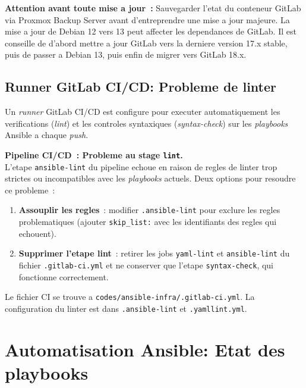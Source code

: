 \documentclass[a4paper,11pt]{article}
\newenvironment{warnbox}{%
  \begin{mdframed}[linecolor=orange,backgroundcolor=orange!8,linewidth=1pt,
    leftmargin=0pt,rightmargin=0pt,innertopmargin=6pt,innerbottommargin=6pt]
}{%
  \end{mdframed}
}
\begin{document}
\begin{warnbox}
  \textbf{Attention avant toute mise a jour~:} Sauvegarder l'etat du conteneur GitLab
  via Proxmox Backup Server avant d'entreprendre une mise a jour majeure.
  La mise a jour de Debian 12 vers 13 peut affecter les dependances de GitLab.
  Il est conseille de d'abord mettre a jour GitLab vers la derniere version 17.x stable,
  puis de passer a Debian 13, puis enfin de migrer vers GitLab 18.x.
\end{warnbox}

\subsection{Runner GitLab CI/CD: Probleme de linter}

Un \textit{runner} GitLab CI/CD est configure pour executer automatiquement
les verifications (\textit{lint}) et les controles syntaxiques (\textit{syntax-check})
sur les \textit{playbooks} Ansible a chaque \textit{push}.

\begin{warnbox}
  \textbf{Pipeline CI/CD~: Probleme au stage \texttt{lint}.}\\
  L'etape \texttt{ansible-lint} du pipeline echoue en raison de regles de linter
  trop strictes ou incompatibles avec les \textit{playbooks} actuels. Deux options
  pour resoudre ce probleme~:
  \begin{enumerate}[noitemsep]
    \item \textbf{Assouplir les regles}~: modifier \texttt{.ansible-lint} pour exclure
          les regles problematiques (ajouter \texttt{skip\_list:} avec les identifiants
          des regles qui echouent).
    \item \textbf{Supprimer l'etape lint}~: retirer les jobs \texttt{yaml-lint} et
          \texttt{ansible-lint} du fichier \texttt{.gitlab-ci.yml} et ne conserver que
          l'etape \texttt{syntax-check}, qui fonctionne correctement.
  \end{enumerate}
\end{warnbox}

Le fichier CI se trouve a \texttt{codes/ansible-infra/.gitlab-ci.yml}.
La configuration du linter est dans \texttt{.ansible-lint} et \texttt{.yamllint.yml}.

\section{Automatisation Ansible: Etat des playbooks}
\end{document}
